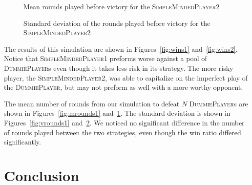 \documentclass[conference]{IEEEtran}
\newcommand\DP{\textsc{DummiePlayer}}
\newcommand\SMPo{\textsc{SimpleMindedPlayer1}}
\newcommand\SMPt{\textsc{SimpleMindedPlayer2}}
\begin{document}
\begin{figure}
    \begin{center}
    \end{center}
    \caption{Mean rounds played before victory for the \SMPt{}}
    \label{fig:mrounds2}
\end{figure}

\begin{figure}
    \begin{center}
    \end{center}
    \caption{Standard deviation of the rounds played before victory for the \SMPt{}}
    \label{fig:vrounds2}
\end{figure}

The results of this simulation are shown in Figures~\ref{fig:wins1}
and~\ref{fig:wins2}. Notice that \SMPo{} preforms worse against a pool of
\DP{}s even though it takes less risk in its strategy. The more risky player,
the \SMPt{}, was able to capitalize on the imperfect play of the \DP{}, but may
not preform as well with a more worthy opponent.

The mean number of rounds from our simulation to defeat $N$ \DP{}s are shown in
Figures~\ref{fig:mrounds1} and~\ref{fig:mrounds2}. The standard deviation is
shown in Figures~\ref{fig:vrounds1} and~\ref{fig:vrounds2}. We noticed no
significant difference in the number of rounds played between the two
strategies, even though the win ratio differed significantly.

\section{Conclusion}
\end{document}
